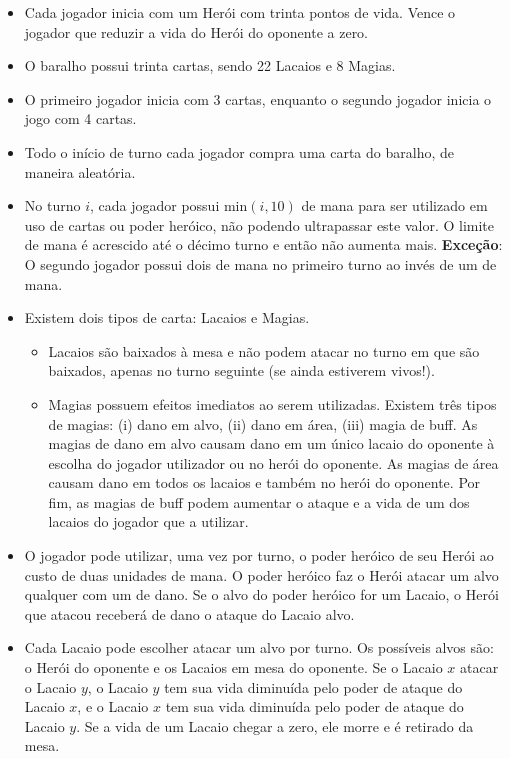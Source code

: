 \documentclass[10pt]{article}
\begin{document}
\begin{itemize}
    \item Cada jogador inicia com um Herói com trinta pontos de vida. Vence o jogador que reduzir a vida do Herói do oponente a zero.
    \item O baralho possui trinta cartas, sendo 22 Lacaios e 8 Magias.
    \item O primeiro jogador inicia com 3 cartas, enquanto o segundo jogador inicia o jogo com 4 cartas.
    \item Todo o início de turno cada jogador compra uma carta do baralho, de maneira aleatória. 
    \item No turno $i$, cada jogador possui min$(i,10)$ de mana para ser utilizado em uso de cartas ou poder heróico, não podendo ultrapassar este valor. O limite de mana é acrescido até o décimo turno e então não aumenta mais. \textbf{Exceção}: O segundo jogador possui dois de mana no primeiro turno ao invés de um de mana.
    \item Existem dois tipos de carta: Lacaios e Magias. 
    \begin{itemize}
        \item Lacaios são baixados à mesa e não podem atacar no turno em que são baixados, apenas no turno seguinte (se ainda estiverem vivos!).
        \item Magias possuem efeitos imediatos ao serem utilizadas. Existem três tipos de magias: (i) dano em alvo, (ii) dano em área, (iii) magia de buff. As magias de dano em alvo causam dano em um único lacaio do oponente à escolha do jogador utilizador ou no herói do oponente. As magias de área causam dano em todos os lacaios e também no herói do oponente. Por fim, as magias de buff podem aumentar o ataque e a vida de um dos lacaios do jogador que a utilizar.
    \end{itemize}
    \item O jogador pode utilizar, uma vez por turno, o poder heróico de seu Herói ao custo de duas unidades de mana. O poder heróico faz o Herói atacar um alvo qualquer com um de dano. Se o alvo do poder heróico for um Lacaio, o Herói que atacou receberá de dano o ataque do Lacaio alvo.
    \item Cada Lacaio pode escolher atacar um alvo por turno. Os possíveis alvos são: o Herói do oponente e os Lacaios em mesa do oponente. Se o Lacaio $x$ atacar o Lacaio $y$, o Lacaio $y$ tem sua vida diminuída pelo poder de ataque do Lacaio $x$, e o Lacaio $x$ tem sua vida diminuída pelo poder de ataque do Lacaio $y$. Se a vida de um Lacaio chegar a zero, ele morre e é retirado da mesa.

\end{itemize}
\end{document}
